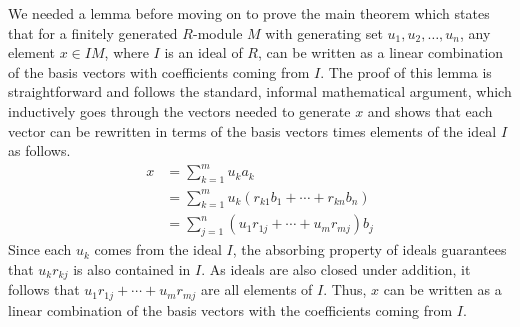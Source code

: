 \documentclass{article}
\begin{document}
We needed a lemma before moving on to prove the main theorem which states that
for a finitely generated $R$-module \(M\) with generating set
\(u_{1}, u_{2}, \dots, u_{n}\), any element \(x\in I M\), where \(I\) is an
ideal of $R$, can be written as a linear combination of the basis vectors with
coefficients coming from \(I\). 
 The proof of this lemma is straightforward and
follows the standard, informal mathematical argument, which inductively goes
through the vectors needed to generate \(x\) and shows that each vector can be
rewritten in terms of the basis vectors times elements of the ideal \(I\) as
follows.
\begin{align*}
  x & = \sum_{k=1}^{m} u_{k} a_{k} \\
    & = \sum_{k=1}^{m} u_{k} (r_{k1} b_{1} + \cdots + r_{kn} b_{n}) \\
    & = \sum_{j=1}^{n} (u_{1} r_{1j} + \cdots + u_{m} r_{mj}) b_{j}
\end{align*}
Since each \(u_{k}\) comes from the ideal \(I\), the absorbing property of
ideals guarantees that \(u_{k} r_{k j}\) is also contained in \(I\). As ideals
are also closed under addition, it follows that \(u_{1} r_{1j} + \cdots +
u_{m} r_{m j}\) are all elements of \(I\). Thus, \(x\) can be written as a
linear combination of the basis vectors with the coefficients coming from
\(I\).
\end{document}
